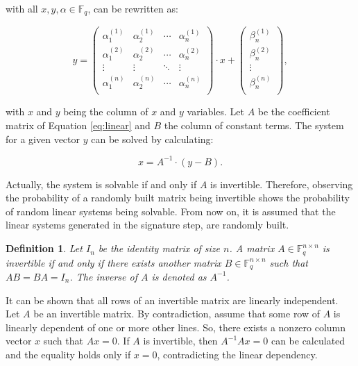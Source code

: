 \documentclass{ufsctex/ufsctex}
\newtheorem{definition}{Definition}
\begin{document}
\noindent
with all $x, y, \alpha \in \mathbb{F}_q$, can be rewritten as:

\begin{equation}\label{eq:linear}
y =
\begin{pmatrix}
\alpha^{(1)}_1 & \alpha^{(1)}_2 & \cdots & \alpha^{(1)}_n \\
\alpha^{(2)}_1 & \alpha^{(2)}_2 & \cdots & \alpha^{(2)}_n \\
\vdots & \vdots & \ddots & \vdots \\
\alpha^{(n)}_1 & \alpha^{(n)}_2 & \cdots & \alpha^{(n)}_n \\
\end{pmatrix}
\cdot x +
\begin{pmatrix}
\beta^{(1)}_n \\
\beta^{(2)}_n \\
\vdots \\
\beta^{(n)}_n \\
\end{pmatrix},
\end{equation}

\noindent
with $x$ and $y$ being the column of $x$ and $y$ variables. Let $A$ be the
coefficient matrix of Equation \ref{eq:linear} and $B$ the column of constant
terms. The system for a given vector $y$ can be solved by calculating:

\begin{equation}
x = A^{-1} \cdot (y - B).
\end{equation}

Actually, the system is solvable if and only if $A$ is invertible. Therefore,
observing the probability of a randomly built matrix being invertible shows the
probability of random linear systems being solvable. From now on, it is assumed
that the linear systems generated in the signature step, are randomly built.

\begin{definition}
Let $I_n$ be the identity matrix of size $n$. A matrix $A \in \mathbb{F}^{n
\times n}_q$ is invertible if and only if there exists another matrix $B \in
\mathbb{F}^{n \times n}_q$ such that $AB = BA = I_n$. The inverse of $A$ is
denoted as $A^{-1}$.
\end{definition}

It can be shown that all rows of an invertible matrix are linearly independent.
Let $A$ be an invertible matrix. By contradiction, assume that some row of $A$
is linearly dependent of one or more other lines. So, there exists a nonzero
column vector $x$ such that $Ax = 0$. If $A$ is invertible, then $A^{-1}Ax = 0$
can be calculated and the equality holds only if $x=0$, contradicting the
linear dependency.
\end{document}
